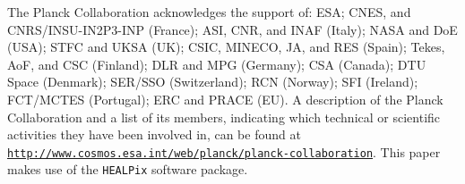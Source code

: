 \documentclass[traditabstract, longauth]{aa}
\newcommand{\1}{\'\i }
\begin{document}
\begin{acknowledgements}
The Planck Collaboration acknowledges the support of: ESA; CNES, and
CNRS/INSU-IN2P3-INP (France); ASI, CNR, and INAF (Italy); NASA and DoE
(USA); STFC and UKSA (UK); CSIC, MINECO, JA, and RES (Spain); Tekes, AoF,
and CSC (Finland); DLR and MPG (Germany); CSA (Canada); DTU Space
(Denmark); SER/SSO (Switzerland); RCN (Norway); SFI (Ireland);
FCT/MCTES (Portugal); ERC and PRACE (EU). A description of the Planck
Collaboration and a list of its members, indicating which technical
or scientific activities they have been involved in, can be found at
\href{http://www.cosmos.esa.int/web/planck/planck-collaboration}{\texttt{http://www.cosmos.esa.int/web/planck/planck-collaboration}}.
This paper makes use of the {\tt HEALPix} software package.
\end{acknowledgements}





\appendix
\end{document}
